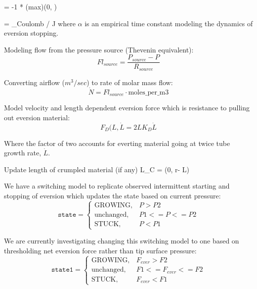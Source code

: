 \documentclass[letterpaper]{article}
\begin{document}

\beq
{} = -1 * \mathrm(max)(0, \alpha * )
\eeq

\beq
\ddot{\theta} = \tau_{Coulomb} / J
\eeq
where $\alpha$ is an empirical time constant modeling the dynamics of eversion stopping.

Modeling flow from the pressure source (Thevenin equivalent):
\begin{equation}\label{eqOneCompartmentflow}
Fl_{source} = \frac {P_{source}-P} {R_{source}}
\end{equation}

Converting airflow ($m^3/sec$) to rate of molar mass flow:
\begin{equation}\label{eqOneCompartmentNdot}
\dot{N} = Fl_{source} \cdot \mathrm{moles\_per\_m3}
\end{equation}

Model velocity and length dependent eversion force which is resistance to pulling out eversion material:
\begin{equation}
F_D(L,\dot{L} = 2 L  K_D  \dot{L}
\end{equation}

Where the factor of two accounts for everting material going at twice tube growth rate, $\dot{L}$.

Update length of  crumpled material (if any)
\beq
L_C = (0,  r\theta - L)
\eeq

We have a switching model to replicate observed intermittent starting and stopping of eversion
which updates the state based on current pressure:
\begin{equation}
    \mathtt{state} =
    \begin{cases}
      \mathrm{GROWING}, &  P > P2 \\
      \mathrm{unchanged}, & P1 <= P <= P2 \\
      \mathrm{STUCK},   &  P < P1
    \end{cases}
\end{equation}



We are currently investigating changing this switching model to one based on thresholding
net eversion force rather than tip surface pressure:
\begin{equation}
    \mathtt{state1} =
    \begin{cases}
      \mathrm{GROWING},   &  F_{ever} > F2 \\
      \mathrm{unchanged}, &  F1 <= F_{ever} <= F2 \\
      \mathrm{STUCK},     &  F_{ever} < F1
    \end{cases}
\end{equation}
\end{document}
